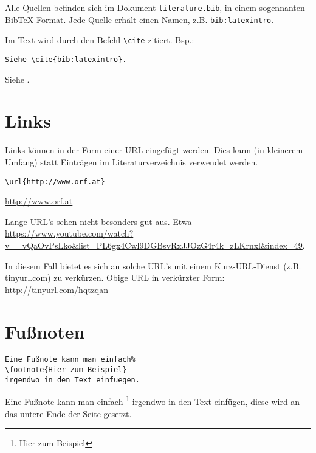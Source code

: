 Alle Quellen befinden sich im Dokument \verb+literature.bib+, in einem sogennanten BibTeX Format.
Jede Quelle erhält einen Namen, z.B. \lstinline|bib:latexintro|.

Im Text wird durch den Befehl \lstinline{\cite} zitiert.
Bsp.:

\begin{Verbatim}[frame=single]
Siehe \cite{bib:latexintro}.
\end{Verbatim}

\begin{framed}
Siehe \cite{bib:latexintro}.
\end{framed}



\section{Links}

Links können in der Form einer URL eingefügt werden.
Dies kann (in kleinerem Umfang) statt Einträgen im Literaturverzeichnis verwendet werden.

\begin{Verbatim}[frame=single]
\url{http://www.orf.at}
\end{Verbatim}
\begin{framed}
\url{http://www.orf.at}
\end{framed}

Lange URL's sehen nicht besonders gut aus. Etwa \url{https://www.youtube.com/watch?v=_vQaOvPsLko&list=PL6gx4Cwl9DGBsvRxJJOzG4r4k_zLKrnxl&index=49}.

In diesem Fall bietet es sich an solche URL's mit einem Kurz-URL-Dienst (z.B. \url{tinyurl.com}) zu verkürzen. 
Obige URL in verkürzter Form: \url{http://tinyurl.com/hqtzqan}


\section{Fußnoten}

\begin{Verbatim}[frame=single]
Eine Fußnote kann man einfach%
\footnote{Hier zum Beispiel}
irgendwo in den Text einfuegen.
\end{Verbatim}

Eine Fußnote kann man einfach%
\footnote{Hier zum Beispiel}
irgendwo in den Text einfügen, diese wird an das untere Ende der Seite gesetzt.


